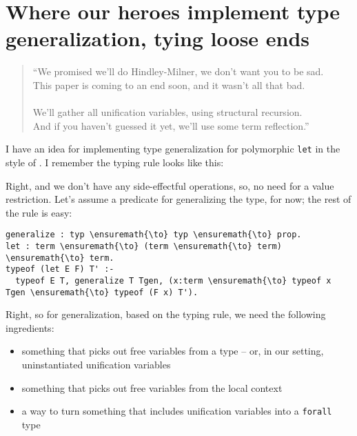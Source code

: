 \section{Where our heroes implement type generalization, tying loose
ends}\label{where-our-heroes-implement-type-generalization-tying-loose-ends}

\begin{verse}
``We promised we'll do Hindley-Milner, we don't want you to be sad. \\
This paper is coming to an end soon, and it wasn't all that bad. \\
\hspace{1em}\vspace{-0.5em} \\
We'll gather all unification variables, using structural recursion. \\
And if you haven't guessed it yet, we'll use some term reflection.''
\end{verse}

\heroSTUDENT{} I have an idea for implementing type generalization for
polymorphic \texttt{let} in the style of
\citet{damas1984type,hindley1969principal,milner1978theory}. I remember
the typing rule looks like this:

\vspace{-1.2em}\begin{mathpar}
\end{mathpar}

\heroADVISOR{} Right, and we don't have any side-effectful operations, so, no
need for a value restriction. Let's assume a predicate for generalizing
the type, for now; the rest of the rule is easy:

\begin{verbatim}
generalize : typ \ensuremath{\to} typ \ensuremath{\to} prop.
let : term \ensuremath{\to} (term \ensuremath{\to} term) \ensuremath{\to} term.
typeof (let E F) T' :-
  typeof E T, generalize T Tgen, (x:term \ensuremath{\to} typeof x Tgen \ensuremath{\to} typeof (F x) T').
\end{verbatim}

\heroSTUDENT{} Right, so for generalization, based on the typing rule, we need
the following ingredients:

\begin{itemize}
\tightlist
\item
  something that picks out free variables from a type -- or, in our
  setting, uninstantiated unification variables
\item
  something that picks out free variables from the local context
\item
  a way to turn something that includes unification variables into a
  \texttt{forall} type
\end{itemize}

